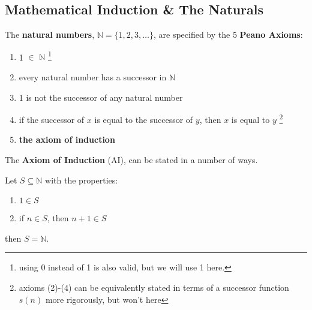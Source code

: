\documentclass[12pt]{article}
\begin{document}
\subsection{Mathematical Induction \& The Naturals}

The \textbf{natural numbers}, $\mathbb{N} = \{1, 2, 3, \dots \}$, are specified by the 5 \textbf{Peano Axioms}:

\begin{enumerate}[label=(\arabic*)]
  \item 1 $\in$ $\mathbb{N}$
  \footnote{using 0 instead of 1 is also valid, but we will use 1 here.}
  \item every natural number has a successor in $\mathbb{N}$
  \item 1 is not the successor of any natural number
  \item if the successor of $x$ is equal to the successor of $y$, then $x$ is equal to $y$
  \footnote{axioms (2)-(4) can be equivalently stated in terms of a successor function $s(n)$ more rigorously, but won't here}
  \item \textbf{the axiom of induction}
\end{enumerate}

The \textbf{Axiom of Induction} (AI), can be stated in a number of ways. 

\begin{axiom}[AI.i]
  Let $S \subseteq \mathbb{N}$ with the properties:
  \begin{enumerate}[label=(\alph*)]
    \item $1 \in S$ 
    \item if $n \in S$, then $n+1 \in S$\footnotemark
  \end{enumerate}
  then $S = \mathbb{N}$.
\end{axiom}
\end{document}
